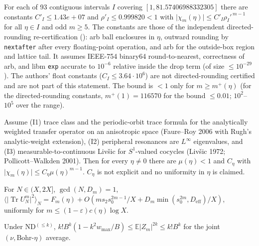 \begin{theorem}
\label{thm:lineB-dcert}
For each of 93 contiguous intervals \(I\) covering \([1,81.57406988332305]\) there are constants \(C'_I\le 1.43e+07\) and \(\rho'_I\le 0.999820<1\) with
\(\lvert\chi_m(\eta)\rvert\le C'_I\rho_I'^{\,m-1}\) for all \(\eta\in I\) and odd \(m\ge 5\).
The constants are those of the independent directed-rounding re-certification (): arb ball enclosures in \(\eta\), outward rounding by \texttt{nextafter} after every floating-point operation, and arb for the outside-box region and lattice tail.
It assumes IEEE-754 binary64 round-to-nearest, correctness of arb, and libm \texttt{exp} accurate to \(10^{-6}\) relative inside the drop term (of size \(\le10^{-29}\)).
The authors' float constants (\(C_I\le3.64\cdot10^6\)) are not directed-rounding certified and are not part of this statement.
The bound is \(<1\) only for \(m\ge m^+(\eta)\) (for the directed-rounding constants, \(m^+(1)=116570\) for the bound \(\le 0.01\); \(10^2\)--\(10^5\) over the range).
\end{theorem}

\begin{theorem}
Assume (I1) trace class and the periodic-orbit trace formula for the analytically weighted transfer operator on an anisotropic space
(Faure--Roy 2006 with Rugh's analytic-weight extension), (I2) peripheral resonances are \(L^\infty\) eigenvalues, and (I3) measurable-to-continuous Liv\v{s}ic for \(S^1\)-valued cocycles (Liv\v{s}ic 1972; Pollicott--Walkden 2001).
Then for every \(\eta\ne0\) there are \(\mu(\eta)<1\) and \(C_\eta\) with \(\lvert\chi_m(\eta)\rvert\le C_\eta\mu(\eta)^{m-1}\). \(C_\eta\) is not explicit and no uniformity in \(\eta\) is claimed.
\end{theorem}

\begin{theorem}
For \(N\in(X,2X]\), \(\gcd(N,D_m)=1\),
\(\langle\lvert\operatorname{Tr}U_N^m\rvert^2\rangle_N=F_m(\eta)+O(m s_2s_0^{2m-1}/X+D_m\min(s_0^{2m},D_{\mathrm{eff}})/X)\), uniformly for \(m\le(1-\varepsilon)c(\eta)\log X\).
\end{theorem}

\begin{theorem}
Under ND\(^{(\le k)}\), \(k!B^k(1-k^2w_{\max}/B)\le\mathbb E\lvert Z_m\rvert^{2k}\le k!B^k\) for the joint \((\nu,\text{Bohr-}\eta)\) average.
\end{theorem}


